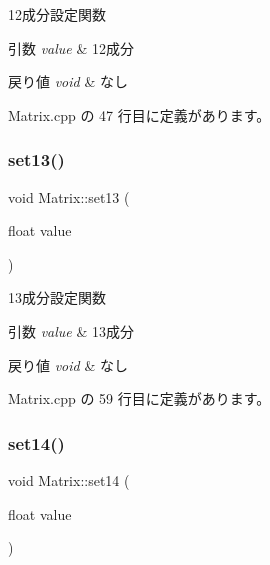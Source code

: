 12成分設定関数 


\begin{DoxyParams}{引数}
{\em value} & 12成分 \\
\hline
\end{DoxyParams}

\begin{DoxyRetVals}{戻り値}
{\em void} & なし \\
\hline
\end{DoxyRetVals}


 Matrix.\+cpp の 47 行目に定義があります。

\mbox{\label{class_matrix_a0aa865228e8713575ccba777c0a1a059}} 
\subsubsection{\texorpdfstring{set13()}{set13()}}
{\footnotesize\ttfamily void Matrix\+::set13 (\begin{DoxyParamCaption}\item[{float}]{value }\end{DoxyParamCaption})}



13成分設定関数 


\begin{DoxyParams}{引数}
{\em value} & 13成分 \\
\hline
\end{DoxyParams}

\begin{DoxyRetVals}{戻り値}
{\em void} & なし \\
\hline
\end{DoxyRetVals}


 Matrix.\+cpp の 59 行目に定義があります。

\mbox{\label{class_matrix_a289a3908210e92d94534d30dc0b12476}} 
\subsubsection{\texorpdfstring{set14()}{set14()}}
{\footnotesize\ttfamily void Matrix\+::set14 (\begin{DoxyParamCaption}\item[{float}]{value }\end{DoxyParamCaption})}



